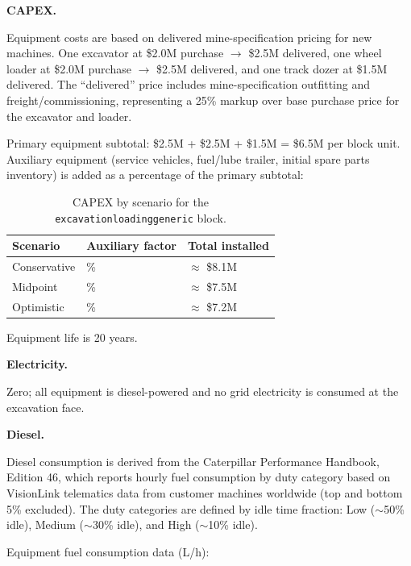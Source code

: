 \documentclass{article}
\renewcommand\_{\textunderscore\allowbreak}
\begin{document}
\medskip
\noindent\textbf{CAPEX.}\quad

Equipment costs are based on delivered mine-specification pricing for new machines. One excavator at \$2.0M purchase $\rightarrow$ \$2.5M delivered, one wheel loader at \$2.0M purchase $\rightarrow$ \$2.5M delivered, and one track dozer at \$1.5M delivered. The ``delivered'' price includes mine-specification outfitting and freight/commissioning, representing a 25\% markup over base purchase price for the excavator and loader.

Primary equipment subtotal: \$2.5M + \$2.5M + \$1.5M = \$6.5M per block unit. Auxiliary equipment (service vehicles, fuel/lube trailer, initial spare parts inventory) is added as a percentage of the primary subtotal:

\begin{table}[h!]
\caption{CAPEX by scenario for the \texttt{excavation\_loading\_generic} block.}
\centering
\begin{tabular}{>{\raggedright\arraybackslash}p{5.2cm}
				>{\raggedright\arraybackslash}p{4cm}
				>{\raggedright\arraybackslash}p{4.5cm}}
\toprule
\textbf{Scenario} & \textbf{Auxiliary factor} & \textbf{Total installed} \\
\midrule
Conservative & 25\% & $\approx$ \$8.1M \\
Midpoint & 15\% &  $\approx$ \$7.5M \\
Optimistic & 10\% &  $\approx$ \$7.2M \\
\bottomrule
\end{tabular}
\end{table}

\noindent Equipment life is 20 years.

\medskip
\noindent\textbf{Electricity.}\quad

Zero; all equipment is diesel-powered and no grid electricity is consumed at the excavation face.

\medskip
\noindent\textbf{Diesel.}\quad

Diesel consumption is derived from the Caterpillar Performance Handbook, Edition 46, which reports hourly fuel consumption by duty category based on VisionLink telematics data from customer machines worldwide (top and bottom 5\% excluded). The duty categories are defined by idle time fraction: Low ($\sim$50\% idle), Medium ($\sim$30\% idle), and High ($\sim$10\% idle).

Equipment fuel consumption data (L/h):
\end{document}
